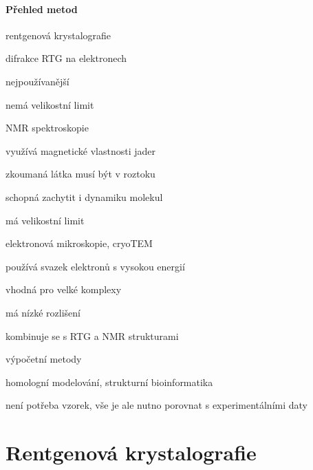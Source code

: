 \documentclass[DIV=8]{scrreprt}
\begin{document}
\paragraph{Přehled metod}
\begin{myItemize}[nosep]
    \item rentgenová krystalografie
\begin{myItemize}[nosep]
    \item difrakce RTG na elektronech
    \item nejpoužívanější
    \item nemá velikostní limit
\end{myItemize}

    \item NMR spektroskopie
\begin{myItemize}[nosep]
    \item využívá magnetické vlastnosti jader
    \item zkoumaná látka musí být v roztoku
    \item schopná zachytit i dynamiku molekul
    \item má velikostní limit
\end{myItemize}

    \item elektronová mikroskopie, cryoTEM
\begin{myItemize}[nosep]
    \item používá svazek elektronů s vysokou energií
    \item vhodná pro velké komplexy
    \item má nízké rozlišení
    \item kombinuje se s RTG a NMR strukturami
\end{myItemize}

    \item výpočetní metody
\begin{myItemize}[nosep]
    \item homologní modelování, strukturní bioinformatika
    \item není potřeba vzorek, vše je ale nutno porovnat s experimentálními daty
\end{myItemize}

\end{myItemize}



\section{Rentgenová krystalografie} \label{Rentgenová krystalografie} \FloatBarrier
\end{document}
